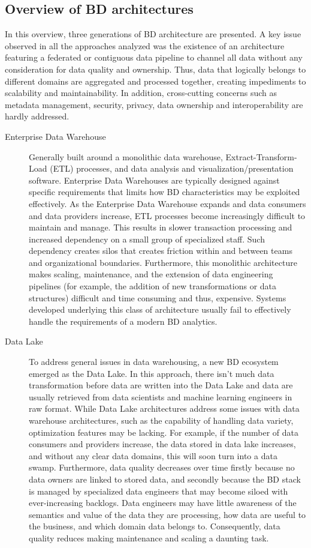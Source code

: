 \documentclass[a4paper,11pt]{article}
\begin{document}
\subsection{Overview of BD architectures} \label{BDArchitecture}
In this overview, three generations of BD architecture are presented. A key issue observed in all the approaches analyzed was the existence of an architecture featuring a federated or contiguous data pipeline to  channel all data without any consideration for data quality and ownership. Thus, data that logically belongs to different domains are aggregated and processed together, creating impediments to scalability and maintainability. In addition, cross-cutting concerns such as metadata management, security, privacy, data ownership and interoperability are hardly addressed.

\begin{description}
    \item[Enterprise Data Warehouse] Generally built around a monolithic data warehouse, Extract-Transform-Load (ETL) processes, and data analysis and visualization/presentation software. Enterprise Data Warehouses are typically designed against specific requirements that limits how BD characteristics may be exploited effectively. As the Enterprise Data Warehouse expands and data consumers and data providers increase, ETL processes become increasingly difficult to maintain and manage. This results in slower transaction processing and increased dependency on a small group of specialized staff. Such dependency creates silos that creates friction within and between teams and organizational boundaries. Furthermore, this monolithic architecture makes scaling, maintenance, and the extension of data engineering pipelines (for example, the addition of new transformations or data structures)  difficult and time consuming and thus, expensive. Systems developed underlying this class of architecture usually fail to effectively handle the requirements of a modern BD analytics.
    \item[Data Lake] To address general issues in data warehousing, a new BD ecosystem emerged as the Data Lake. In this approach, there isn't much data transformation before data are written into the Data Lake and data are usually retrieved from data scientists and machine learning engineers in raw format. While Data Lake architectures address some issues with data warehouse architectures, such as the capability of handling data variety, optimization features may be lacking. For example, if the number of data consumers and providers increase, the data stored in data lake increases, and without any clear data domains, this will soon turn into a data swamp. Furthermore, data quality decreases over time firstly because no data owners are linked to stored data, and secondly because the BD stack is managed by specialized data engineers that may become siloed with ever-increasing backlogs. Data engineers may have little awareness of the semantics and value of the data they are processing, how data are useful to the business, and which domain data belongs to. Consequently, data quality reduces making maintenance and scaling a daunting task. 

\end{description}
\end{document}
